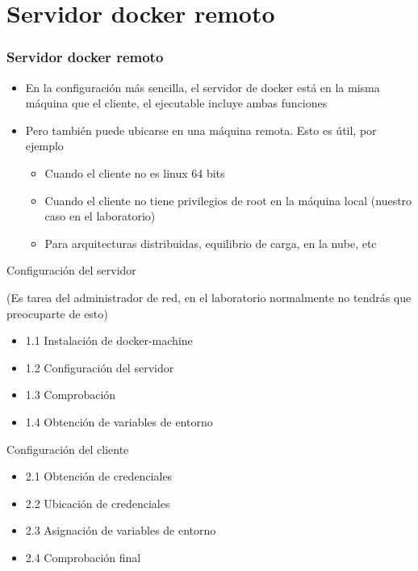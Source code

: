 \documentclass[ucs]{beamer}
\begin{document}
\section{Servidor docker remoto}
\begin{frame}[fragile]
\frametitle{Servidor docker remoto}
\begin{itemize}
\item
En la configuración más sencilla, el servidor de docker está en la misma
máquina que el cliente, el ejecutable incluye ambas funciones

\item
Pero también puede ubicarse en una máquina remota. Esto es útil, por ejemplo

\begin{itemize}
\item
Cuando el cliente no es linux 64 bits

\item
Cuando el cliente no tiene privilegios de root en la máquina local 
(nuestro caso en el laboratorio)

\item
Para arquitecturas distribuidas, equilibrio de carga, en la nube, etc

\end{itemize}
\end{itemize}





\end{frame}
\begin{frame}[fragile]
Configuración del servidor


(Es tarea del administrador de red, en el laboratorio normalmente no tendrás que preocuparte de esto)
\begin{itemize}
\item
1.1 Instalación de docker-machine
\item
1.2 Configuración del servidor
\item
1.3 Comprobación
\item
1.4 Obtención de variables de entorno
\end{itemize}


Configuración del cliente

\begin{itemize}
\item
2.1 Obtención de credenciales 
\item
2.2 Ubicación de credenciales 
\item
2.3 Asignación de variables de entorno 
\item
2.4 Comprobación final
\end{itemize}


\end{frame}
\end{document}
